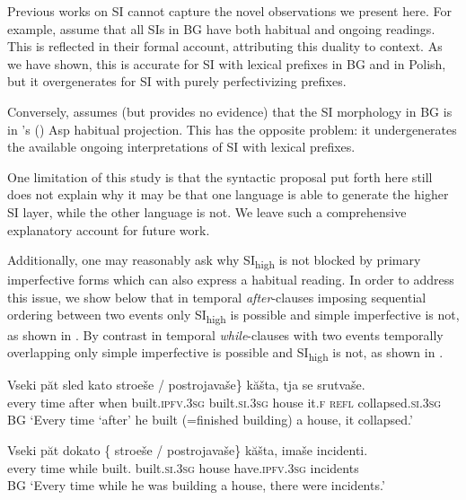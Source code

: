 \documentclass[output=paper,colorlinks,citecolor=brown]{langscibook}
\begin{document}
Previous works on SI cannot capture the novel observations we present here. For example, \citet{rivero2014} assume that all SIs in BG have both habitual and ongoing readings. This is reflected in their formal account, attributing this duality to context. 
As we have shown, this is accurate for SI with lexical prefixes in BG and in Polish, but it overgenerates for SI with purely perfectivizing prefixes. 

Conversely, \citet{markova2011} assumes (but provides no evidence) that the SI morphology in BG is in \citeauthor{cinque1999}'s (\citeyear{cinque1999}) Asp habitual projection. This has the opposite problem: it undergenerates the available ongoing interpretations of SI with lexical prefixes.

One limitation of this study is that the syntactic proposal put forth here still does not explain why it may be that one language is able to generate the higher SI layer, while the other language is not. We leave such a comprehensive explanatory account for future work.  

Additionally, one may reasonably ask why SI\textsubscript{high} is not blocked by primary imperfective forms which can also express a habitual reading. In order to address this issue, we show below that in temporal \textit{after}-clauses imposing sequential ordering between two events only SI\textsubscript{high} is possible and simple imperfective is not, as shown in . By contrast in temporal \textit{while}-clauses with two events temporally overlapping only simple imperfective is possible and  SI\textsubscript{high} is not, as shown in .


\ea\label{bg:when-clause} \gll Vseki păt sled kato  stroeše / postrojavaše\} kăšta, tja se srutvaše. \\
%
every time after when {} built.\textsc{ipfv.3sg} {} built.\textsc{si}.\textsc{3sg} house it.\textsc{f} \textsc{refl} collapsed.\textsc{si}.\textsc{3sg}\\ \hfill BG
%
\glt `Every time ‘after’ he built (=finished building) a house, it collapsed.’
\z


\ea\label{bg:while-clause} \gll  Vseki păt dokato \{ stroeše / \minsp{*} postrojavaše\} kăšta, imaše incidenti.\\
%
every time while {} built.{\IPFV} {} {} built.\textsc{si}.\textsc{3sg} house have.\textsc{ipfv.3sg} incidents\\ \hfill BG
%
\glt ‘Every time while he was building a house, there were incidents.’
\z
\end{document}
